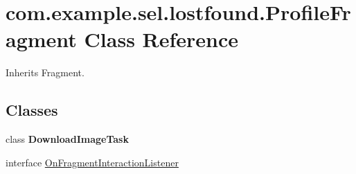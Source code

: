 \hypertarget{classcom_1_1example_1_1sel_1_1lostfound_1_1ProfileFragment}{\section{com.\-example.\-sel.\-lostfound.\-Profile\-Fragment \-Class \-Reference}
\label{classcom_1_1example_1_1sel_1_1lostfound_1_1ProfileFragment}
}


\-Inherits \-Fragment.

\subsection*{\-Classes}
\begin{DoxyCompactItemize}
\item 
class {\bfseries \-Download\-Image\-Task}
\item 
interface \hyperlink{interfacecom_1_1example_1_1sel_1_1lostfound_1_1ProfileFragment_1_1OnFragmentInteractionListener}{\-On\-Fragment\-Interaction\-Listener}
\end{DoxyCompactItemize}
